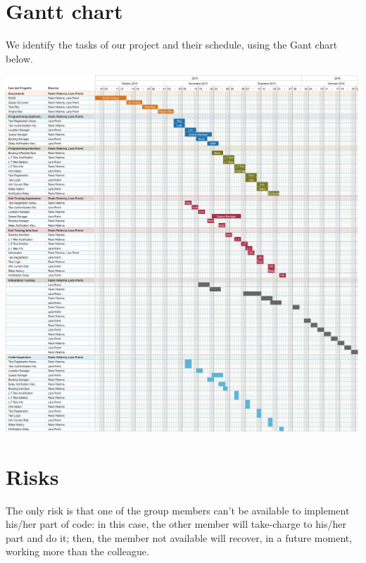 \section{Gantt chart}
We identify the tasks of our project and their schedule, using the Gant chart below.
		\begin{center}
			\includegraphics[width=1\textwidth]{./images/myTaxiService.png}
		\end{center}
\section{Risks}
The only risk is that one of the group members can't be available to implement his/her part of code: in this case, the other member will take-charge to his/her part and do it; then, the member not available will recover, in a future moment, working more than the colleague.
	